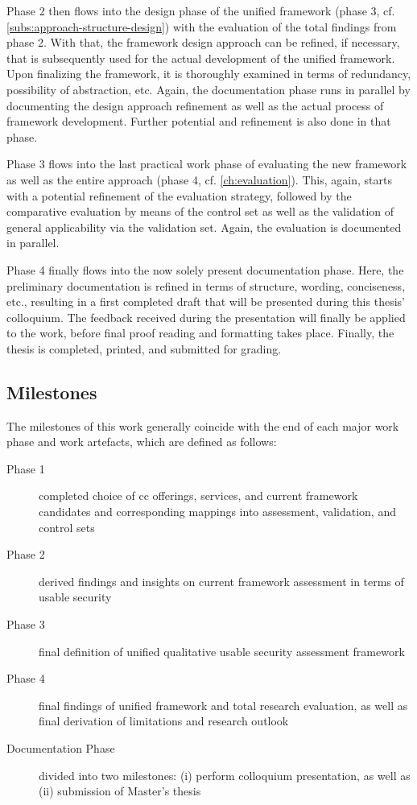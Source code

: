 	Phase 2 then flows into the design phase of the unified framework (phase 3, cf. \autoref{subs:approach-structure-design}) with the evaluation of the total findings from phase 2. With that, the framework design approach can be refined, if necessary, that is subsequently used for the actual development of the unified framework. Upon finalizing the framework, it is thoroughly examined in terms of redundancy, possibility of abstraction, etc. Again, the documentation phase runs in parallel by documenting the design approach refinement as well as the actual process of framework development. Further potential  and  refinement is also done in that phase.
	
	Phase 3 flows into the last practical work phase of evaluating the new framework as well as the entire approach (phase 4, cf. \autoref{ch:evaluation}). This, again, starts with a potential refinement of the evaluation strategy, followed by the comparative evaluation by means of the control set as well as the validation of general applicability via the validation set. Again, the evaluation is documented in parallel.
	
	Phase 4 finally flows into the now solely present documentation phase. Here, the preliminary documentation is refined in terms of structure, wording, conciseness, etc., resulting in a first completed draft that will be presented during this thesis' colloquium. The feedback received during the presentation will finally be applied to the work, before final proof reading and formatting takes place. Finally, the thesis is completed, printed, and submitted for grading.
	
	\subsection{Milestones}
	The milestones of this work generally coincide with the end of each major work phase and work artefacts, which are defined as follows:
	
	\begin{description}
		\item[Phase 1] completed choice of \ac{cc} offerings, services, and current framework candidates and corresponding mappings into assessment, validation, and control sets
		\item[Phase 2] derived findings and insights on current framework assessment in terms of usable security
		\item[Phase 3] final definition of unified qualitative usable security assessment framework
		\item[Phase 4] final findings of unified framework and total research evaluation, as well as final derivation of limitations and research outlook 
		\item[Documentation Phase] divided into two milestones: (i) perform colloquium presentation, as well as (ii) submission of Master's thesis
	\end{description}
	
